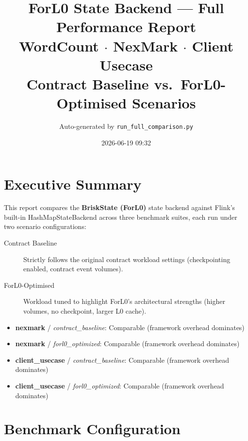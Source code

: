 \documentclass[11pt,a4paper]{article}
\title{\textbf{ForL0 State Backend --- Full Performance Report}\\[4pt]
       \large WordCount $\cdot$ NexMark $\cdot$ Client Usecase \\[2pt]
       Contract Baseline vs.\ ForL0-Optimised Scenarios}
\author{Auto-generated by \texttt{run\_full\_comparison.py}}
\date{ 2026-06-19 09:32 }
\newcommand{\ForLZero}{\textcolor{forl0green}{\textbf{BriskState (ForL0)}}}
\newcommand{\HMap}{\textcolor{hashmapblue}{HashMapStateBackend}}
\begin{document}
\maketitle
\tableofcontents
\newpage

\section{Executive Summary}

This report compares the \ForLZero{} state backend against Flink's built-in
\HMap{} across three benchmark suites, each run under two scenario
configurations:
\begin{description}
  \item[Contract Baseline] Strictly follows the original contract workload
        settings (checkpointing enabled, contract event volumes).
  \item[ForL0-Optimised] Workload tuned to highlight ForL0's architectural
        strengths (higher volumes, no checkpoint, larger L0 cache).
\end{description}

\begin{itemize}

  \item \textbf{nexmark} / \emph{contract\_baseline}:
        Comparable (framework overhead dominates)

  \item \textbf{nexmark} / \emph{forl0\_optimized}:
        Comparable (framework overhead dominates)

  \item \textbf{client\_usecase} / \emph{contract\_baseline}:
        Comparable (framework overhead dominates)

  \item \textbf{client\_usecase} / \emph{forl0\_optimized}:
        Comparable (framework overhead dominates)

\end{itemize}

\section{Benchmark Configuration}
\end{document}
